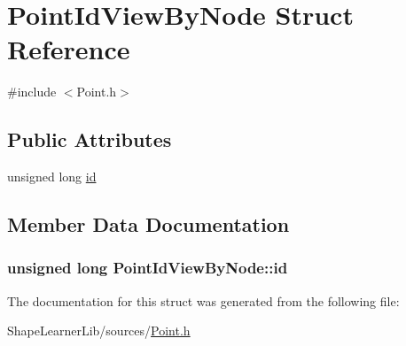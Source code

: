 \hypertarget{struct_point_id_view_by_node}{}\section{Point\+Id\+View\+By\+Node Struct Reference}
\label{struct_point_id_view_by_node}


{\ttfamily \#include $<$Point.\+h$>$}

\subsection*{Public Attributes}
\begin{DoxyCompactItemize}
\item 
unsigned long \hyperlink{struct_point_id_view_by_node_aa9d9055f83c07e6918b99cc543cd2929}{id}
\end{DoxyCompactItemize}


\subsection{Member Data Documentation}
\hypertarget{struct_point_id_view_by_node_aa9d9055f83c07e6918b99cc543cd2929}{}
\subsubsection[{id}]{\setlength{\rightskip}{0pt plus 5cm}unsigned long Point\+Id\+View\+By\+Node\+::id}\label{struct_point_id_view_by_node_aa9d9055f83c07e6918b99cc543cd2929}


The documentation for this struct was generated from the following file\+:\begin{DoxyCompactItemize}
\item 
Shape\+Learner\+Lib/sources/\hyperlink{_point_8h}{Point.\+h}\end{DoxyCompactItemize}
